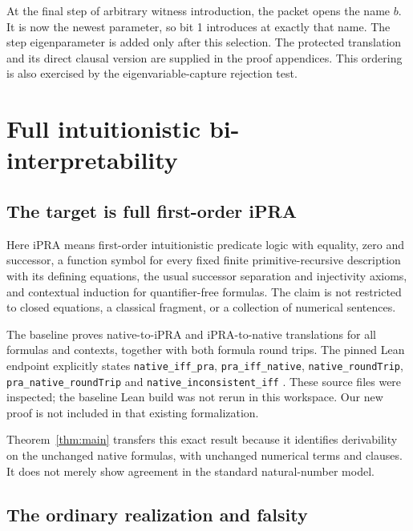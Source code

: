 \documentclass[11pt,letterpaper]{article}
\theoremstyle{definition}
\theoremstyle{remark}
\newcommand{\IPRA}{\mathrm{iPRA}}
\begin{document}
At the final step of arbitrary witness introduction, the packet opens
the name $b$. It is now the newest parameter, so bit 1 introduces at
exactly that name. The step eigenparameter is added only after this
selection. The protected translation and its direct clausal version
are supplied in the proof appendices. This ordering is also exercised
by the eigenvariable-capture rejection test.

\section{Full intuitionistic bi-interpretability}
\label{sec:biinterpretation}

\subsection{The target is full first-order iPRA}

Here $\IPRA$ means first-order intuitionistic predicate logic with
equality, zero and successor, a function symbol for every fixed finite
primitive-recursive description with its defining equations, the usual
successor separation and injectivity axioms, and contextual induction
for quantifier-free formulas. The claim is not restricted to closed
equations, a classical fragment, or a collection of numerical sentences.

The baseline proves native-to-$\IPRA$ and $\IPRA$-to-native translations
for all formulas and contexts, together with both formula round trips.
The pinned Lean endpoint explicitly states
\texttt{native\_iff\_pra}, \texttt{pra\_iff\_native},
\texttt{native\_roundTrip}, \texttt{pra\_native\_roundTrip} and
\texttt{native\_inconsistent\_iff} \cite{biinterp}. These source files
were inspected; the baseline Lean build was not rerun in this workspace.
Our new proof is not included in that existing formalization.

Theorem~\ref{thm:main} transfers this exact result because it identifies
derivability on the unchanged native formulas, with unchanged numerical
terms and clauses. It does not merely show agreement in the standard
natural-number model.

\subsection{The ordinary realization and falsity}
\end{document}
